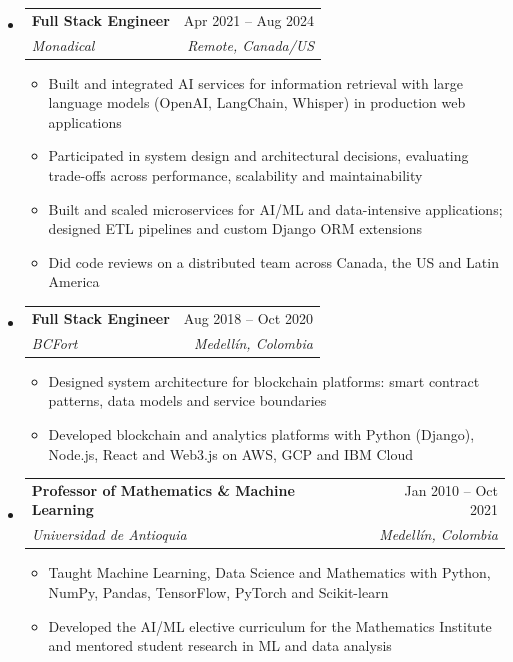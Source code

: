 \documentclass[letterpaper,10pt]{article}
\makeatletter
\newcommand{\resumeSubheading}[4]{
  \vspace{-2pt}
  \item[]
  \begin{tabular*}{\textwidth}{@{\extracolsep{\fill}}l r}
    \textbf{#1} & #2 \\
    \textit{#3} & \textit{#4} \\
  \end{tabular*}
  \vspace{-5pt}
}
\makeatother
\begin{document}
\begin{itemize}[leftmargin=0pt, itemindent=0pt, label={}, itemsep=1pt]
\resumeSubheading
{Full Stack Engineer}{Apr 2021 -- Aug 2024}
{Monadical}{Remote, Canada/US}
\begin{itemize}[leftmargin=*, itemsep=0pt]
    \item Built and integrated AI services for information retrieval with large language models (OpenAI, LangChain, Whisper) in production web applications
    \item Participated in system design and architectural decisions, evaluating trade-offs across performance, scalability and maintainability
    \item Built and scaled microservices for AI/ML and data-intensive applications; designed ETL pipelines and custom Django ORM extensions
    \item Did code reviews on a distributed team across Canada, the US and Latin America
\end{itemize}
\resumeSubheading
{Full Stack Engineer}{Aug 2018 -- Oct 2020}
{BCFort}{Medell\'in, Colombia}
\begin{itemize}[leftmargin=*, itemsep=0pt]
    \item Designed system architecture for blockchain platforms: smart contract patterns, data models and service boundaries
    \item Developed blockchain and analytics platforms with Python (Django), Node.js, React and Web3.js on AWS, GCP and IBM Cloud
\end{itemize}
\resumeSubheading
{Professor of Mathematics \& Machine Learning}{Jan 2010 -- Oct 2021}
{Universidad de Antioquia}{Medell\'in, Colombia}
\begin{itemize}[leftmargin=*, itemsep=0pt]
    \item Taught Machine Learning, Data Science and Mathematics with Python, NumPy, Pandas, TensorFlow, PyTorch and Scikit-learn
    \item Developed the AI/ML elective curriculum for the Mathematics Institute and mentored student research in ML and data analysis
\end{itemize}
\end{itemize}
\end{document}
